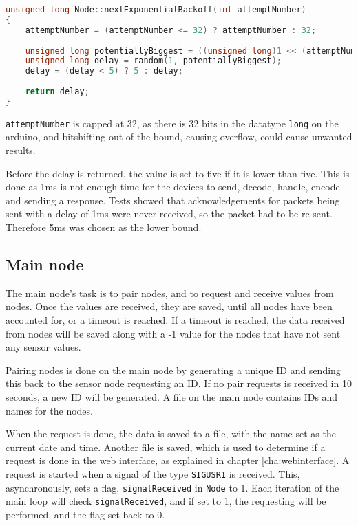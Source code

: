 \begin{lstlisting}[language=C,caption={Exponential backoff on the sensor nodes. In Node.cpp.},label={lst:expbackoff}]
unsigned long Node::nextExponentialBackoff(int attemptNumber)
{
    attemptNumber = (attemptNumber <= 32) ? attemptNumber : 32;
    
    unsigned long potentiallyBiggest = ((unsigned long)1 << (attemptNumber - 1));
    unsigned long delay = random(1, potentiallyBiggest);
    delay = (delay < 5) ? 5 : delay;
    
    return delay;
}
\end{lstlisting}
\texttt{attemptNumber} is capped at 32, as there is 32 bits in the datatype \texttt{long} on the arduino, and bitshifting out of the bound, causing overflow, could cause unwanted results.

Before the delay is returned, the value is set to five if it is lower than five. This is done as 1ms is not enough time for the devices to send, decode, handle, encode and sending a response. Tests showed that acknowledgements for packets being sent with a delay of 1ms were never received, so the packet had to be re-sent. Therefore 5ms was chosen as the lower bound.

\subsection{Main node} \label{cha:signalhandling}
The main node's task is to pair nodes, and to request and receive values from nodes. Once the values are received, they are saved, until all nodes have been accounted for, or a timeout is reached. If a timeout is reached, the data received from nodes will be saved along with a -1 value for the nodes that have not sent any sensor values.

Pairing nodes is done on the main node by generating a unique ID and sending this back to the sensor node requesting an ID. If no pair requests is received in 10 seconds, a new ID will be generated. A file on the main node contains IDs and names for the nodes.

When the request is done, the data is saved to a file, with the name set as the current date and time. Another file is saved, which is used to determine if a request is done in the web interface, as explained in chapter \ref{cha:webinterface}. A request is started when a signal of the type \texttt{SIGUSR1} is received. This, asynchronously, sets a flag, \texttt{signalReceived} in \texttt{Node} to 1. Each iteration of the main loop will check \texttt{signalReceived}, and if set to 1, the requesting will be performed, and the flag set back to 0.
